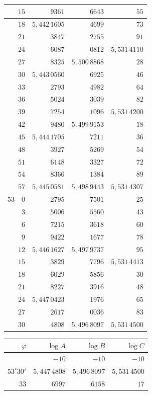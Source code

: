 \begin{center}
\begin{tabular}[t]{|r|r|r|r|}
\(15\)&\(9361\)&\(6643\)&\(55\)\\
\hline
\(18\)&\(5{,}442\,1605\)&\(4699\)&\(73\)\\
\(21\)&\(3847\)&\(2755\)&\(91\)\\
\(24\)&\(6087\)&\(0812\)&\(5{,}531\,4110\)\\
\(27\)&\(8325\)&\(5{,}500\,8868\)&\(28\)\\
\(30\)&\(5{,}443\,0560\)&\(6925\)&\(46\)\\
\hline
\(33\)&\(2793\)&\(4982\)&\(64\)\\
\(36\)&\(5024\)&\(3039\)&\(82\)\\
\(39\)&\(7254\)&\(1096\)&\(5{,}531\,4200\)\\
\(42\)&\(9480\)&\(5{,}499\,9153\)&\(18\)\\
\(45\)&\(5{,}444\,1705\)&\(7211\)&\(36\)\\
\hline
\(48\)&\(3927\)&\(5269\)&\(54\)\\
\(51\)&\(6148\)&\(3327\)&\(72\)\\
\(54\)&\(8366\)&\(1384\)&\(89\)\\
\(57\)&\(5{,}445\,0581\)&\(5{,}498\,9443\)&\(5{,}531\,4307\)\\
\(53\quad0\)&\(2795\)&\(7501\)&\(25\)\\
\hline
\(3\)&\(5006\)&\(5560\)&\(43\)\\
\(6\)&\(7215\)&\(3618\)&\(60\)\\
\(9\)&\(9422\)&\(1677\)&\(78\)\\
\(12\)&\(5{,}446\,1627\)&\(5{,}497\,9737\)&\(95\)\\
\(15\)&\(3829\)&\(7796\)&\(5{,}531\,4413\)\\
\hline
\(18\)&\(6029\)&\(5856\)&\(30\)\\
\(21\)&\(8227\)&\(3916\)&\(48\)\\
\(24\)&\(5{,}447\,0423\)&\(1976\)&\(65\)\\
\(27\)&\(2617\)&\(0036\)&\(83\)\\
\(30\)&\(4808\)&\(5{,}496\,8097\)&\(5{,}531\,4500\)\\
\hline\end{tabular}
\hfill
\begin{tabular}[t]{|r|r|r|r|}\hline
\(\varphi\)&\(\log A\)&\(\log B\)&\(\log C\)\\\hline\hline
&\(-10\)&\(-10\)&\(-10\)\\
\(53^\circ30'\)&\(5{,}447\,4808\)&\(5{,}496\,8097\)&\(5{,}531\,4500\)\\
\(33\)&\(6997\)&\(6158\)&\(17\)\\

\end{tabular}
\end{center}
